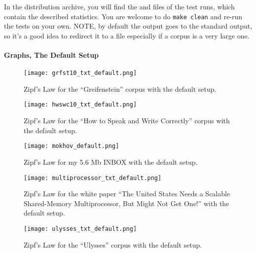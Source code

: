 In the distribution archive, you will find the  and  files
of the test runs, which contain the described statistics. You are welcome
to do \verb+make clean+ and re-run the tests on your own. NOTE, by default
the output goes to the standard output, so it's a good idea to redirect
it to a file especially if a corpus is a very large one.

\paragraph{Graphs, The Default Setup}

\begin{figure}[h!]
	\begin{center}
	\texttt{[image: grfst10\_txt\_default.png]}
	\caption{Zipf's Law for the ``Greifenstein'' corpus with the default setup.}
	\end{center}
\end{figure}

\begin{figure}
    \begin{center}
    \texttt{[image: hwswc10\_txt\_default.png]}
    \caption{Zipf's Law for the ``How to Speak and Write Correctly'' corpus with the default setup.}
    \end{center}
\end{figure}

\begin{figure}
    \begin{center}
    \texttt{[image: mokhov\_default.png]}
    \caption{Zipf's Law for my 5.6 Mb INBOX with the default setup.}
    \end{center}
\end{figure}

\begin{figure}
    \begin{center}
    \texttt{[image: multiprocessor\_txt\_default.png]}
    \caption{Zipf's Law for the white paper ``The United States Needs a Scalable Shared-Memory Multiprocessor, But Might Not Get One!'' with the default setup.}
    \end{center}
\end{figure}

\begin{figure}
    \begin{center}
    \texttt{[image: ulysses\_txt\_default.png]}
    \caption{Zipf's Law for the ``Ulysses'' corpus with the default setup.}
    \end{center}
\end{figure}

